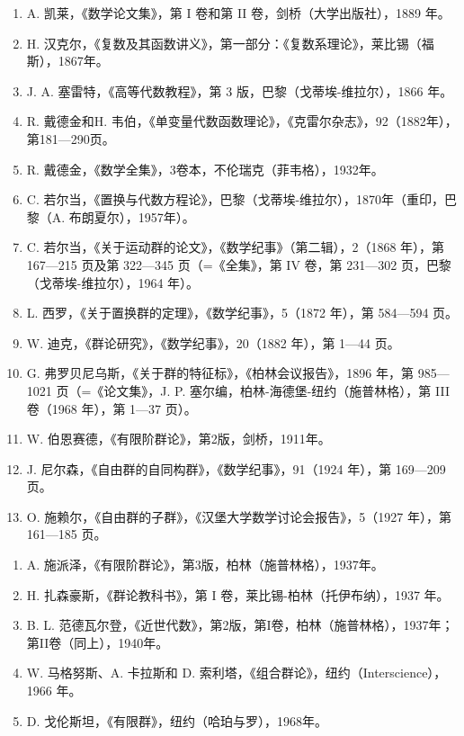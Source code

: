 \begin{enumerate}
\def\labelenumi{\arabic{enumi}.}
\setcounter{enumi}{9}
\item
  A. 凯莱，《数学论文集》，第 I 卷和第 II 卷，剑桥（大学出版社），1889 年。
\item
  H. 汉克尔，《复数及其函数讲义》，第一部分：《复数系理论》，莱比锡（福斯），1867年。
\item
  J. A. 塞雷特，《高等代数教程》，第 3 版，巴黎（戈蒂埃-维拉尔），1866 年。
\item
  R. 戴德金和H. 韦伯，《单变量代数函数理论》，《克雷尔杂志》，92（1882年），第181—290页。
\item
  R. 戴德金，《数学全集》，3卷本，不伦瑞克（菲韦格），1932年。
\item
  C. 若尔当，《置换与代数方程论》，巴黎（戈蒂埃-维拉尔），1870年（重印，巴黎（A. 布朗夏尔），1957年）。
\item
  C. 若尔当，《关于运动群的论文》，《数学纪事》（第二辑），2（1868 年），第 167—215 页及第 322—345 页（=《全集》，第 IV 卷，第 231—302 页，巴黎（戈蒂埃-维拉尔），1964 年）。
\item
  L. 西罗，《关于置换群的定理》，《数学纪事》，5（1872 年），第 584—594 页。
\item
  W. 迪克，《群论研究》，《数学纪事》，20（1882 年），第 1—44 页。
\item
  G. 弗罗贝尼乌斯，《关于群的特征标》，《柏林会议报告》，1896 年，第 985—1021 页（=《论文集》，J. P. 塞尔编，柏林-海德堡-纽约（施普林格），第 III 卷（1968 年），第 1—37 页）。
\item
  W. 伯恩赛德，《有限阶群论》，第2版，剑桥，1911年。
\item
  J. 尼尔森，《自由群的自同构群》，《数学纪事》，91（1924 年），第 169—209 页。
\item
  O. 施赖尔，《自由群的子群》，《汉堡大学数学讨论会报告》，5（1927 年），第 161—185 页。
\end{enumerate}

\begin{enumerate}
\def\labelenumi{\arabic{enumi}.}
\setcounter{enumi}{22}
\item
  A. 施派泽，《有限阶群论》，第3版，柏林（施普林格），1937年。
\item
  H. 扎森豪斯，《群论教科书》，第 I 卷，莱比锡-柏林（托伊布纳），1937 年。
\item
  B. L. 范德瓦尔登，《近世代数》，第2版，第I卷，柏林（施普林格），1937年；第II卷（同上），1940年。
\item
  W. 马格努斯、A. 卡拉斯和 D. 索利塔，《组合群论》，纽约（Interscience），1966 年。
\item
  D. 戈伦斯坦，《有限群》，纽约（哈珀与罗），1968年。
\end{enumerate}

